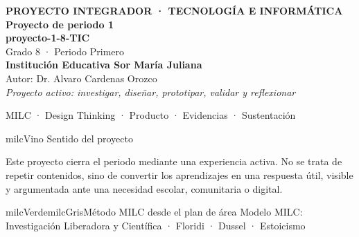 \documentclass[11pt,letterpaper]{article}
\begin{document}
\thispagestyle{empty}

\vspace*{.85cm}
\begin{tcolorbox}[
  enhanced,colback=milcVino,colframe=milcVino,arc=12mm,width=.86\textwidth,
  boxrule=0pt,left=12mm,right=12mm,top=11mm,bottom=11mm,center,
  overlay={\draw[milcMagenta,line width=2pt,dash pattern=on 9pt off 8pt,rounded corners=10mm]
  ([xshift=7mm,yshift=-7mm]frame.north west) rectangle ([xshift=-7mm,yshift=7mm]frame.south east);}]
  \centering
  {\sffamily\bfseries\color{white}\fontsize{15}{17}\selectfont PROYECTO INTEGRADOR · TECNOLOGÍA E INFORMÁTICA}\\[1.0cm]
  {\sffamily\bfseries\color{white}\fontsize{30}{33}\selectfont Proyecto de periodo 1}\\[3mm]
  {\sffamily\bfseries\color{milcMostaza}\fontsize{25}{28}\selectfont proyecto-1-8-TIC}\\[8mm]
  {\sffamily\color{white}\Large Grado 8 · Periodo Primero}\\[1.0cm]
  {\sffamily\bfseries\color{white}\large Institución Educativa Sor María Juliana}\\[2mm]
  {\sffamily\color{white}Autor: Dr. Alvaro Cardenas Orozco}\\[4mm]
  {\sffamily\itshape\color{white}Proyecto activo: investigar, diseñar, prototipar, validar y reflexionar}
\end{tcolorbox}
\vfill
\begin{tcolorbox}[enhanced,colback=milcVino!72!black,colframe=milcVino!72!black,arc=5mm,boxrule=0pt,width=.86\textwidth,left=6mm,right=6mm,top=4mm,bottom=4mm,center]
{\color{white}\sffamily\small MILC · Design Thinking · Producto · Evidencias · Sustentación}
\end{tcolorbox}

\newpage
\begin{titlebox}{milcVino}
Sentido del proyecto
\end{titlebox}
\begin{multicols}{2}
Este proyecto cierra el periodo mediante una experiencia activa. No se trata de repetir contenidos, sino de convertir los aprendizajes en una respuesta útil, visible y argumentada ante una necesidad escolar, comunitaria o digital.

\columnbreak
\begin{softbox}{milcVerde}{milcGris}{Método MILC desde el plan de área}
Modelo MILC: Investigación Liberadora y Científica · Floridi · Dussel · Estoicismo
\end{softbox}
\end{multicols}
\end{document}
